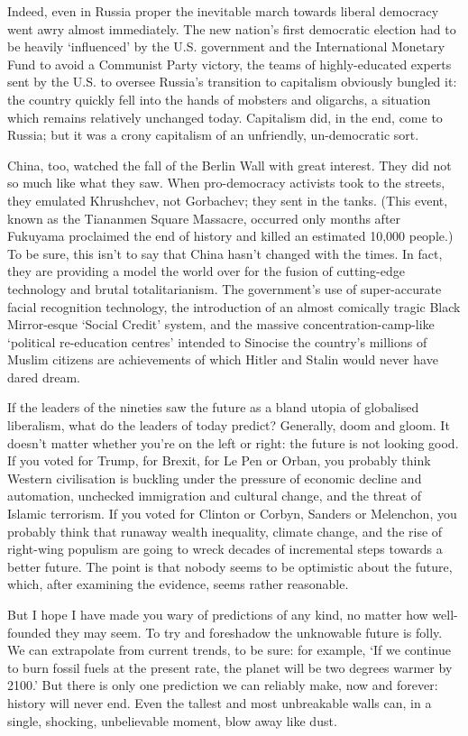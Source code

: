    Indeed, even in Russia proper the inevitable march towards liberal
   democracy went awry almost immediately. The new nation's first
   democratic election had to be heavily `influenced' by the U.S.
   government and the International Monetary Fund to avoid a Communist
   Party victory, the teams of highly-educated experts sent by the U.S. to
   oversee Russia's transition to capitalism obviously bungled it: the
   country quickly fell into the hands of mobsters and oligarchs, a
   situation which remains relatively unchanged today. Capitalism did, in
   the end, come to Russia; but it was a crony capitalism of an
   unfriendly, un-democratic sort.

   China, too, watched the fall of the Berlin Wall with great interest.
   They did not so much like what they saw. When pro-democracy activists
   took to the streets, they emulated Khrushchev, not Gorbachev; they sent
   in the tanks. (This event, known as the Tiananmen Square Massacre,
   occurred only months after Fukuyama proclaimed the end of history and
   killed an estimated 10,000 people.) To be sure, this isn't to say that
   China hasn't changed with the times. In fact, they are providing a
   model the world over for the fusion of cutting-edge technology and
   brutal totalitarianism. The government's use of super-accurate facial
   recognition technology, the introduction of an almost comically tragic
   Black Mirror-esque `Social Credit' system, and the massive
   concentration-camp-like `political re-education centres' intended to
   Sinocise the country's millions of Muslim citizens are achievements of
   which Hitler and Stalin would never have dared dream.

   If the leaders of the nineties saw the future as a bland utopia of
   globalised liberalism, what do the leaders of today predict? Generally,
   doom and gloom. It doesn't matter whether you're on the left or right:
   the future is not looking good. If you voted for Trump, for Brexit, for
   Le Pen or Orban, you probably think Western civilisation is buckling
   under the pressure of economic decline and automation, unchecked
   immigration and cultural change, and the threat of Islamic terrorism.
   If you voted for Clinton or Corbyn, Sanders or Melenchon, you probably
   think that runaway wealth inequality, climate change, and the rise of
   right-wing populism are going to wreck decades of incremental steps
   towards a better future. The point is that nobody seems to be
   optimistic about the future, which, after examining the evidence, seems
   rather reasonable.

   But I hope I have made you wary of predictions of any kind, no matter
   how well-founded they may seem. To try and foreshadow the unknowable
   future is folly. We can extrapolate from current trends, to be sure:
   for example, `If we continue to burn fossil fuels at the present rate,
   the planet will be two degrees warmer by 2100.' But there is only one
   prediction we can reliably make, now and forever: history will never
   end. Even the tallest and most unbreakable walls can, in a single,
   shocking, unbelievable moment, blow away like dust.

